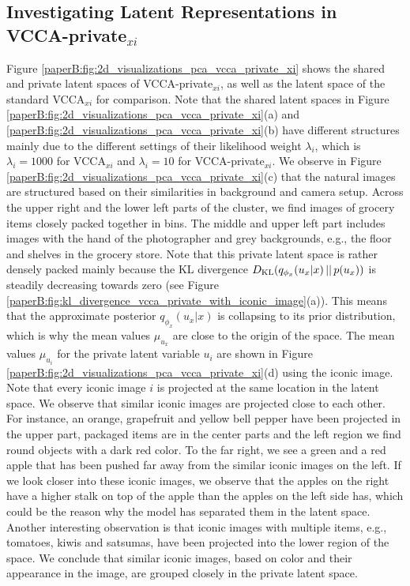 
\subsection{Investigating Latent Representations in VCCA-private\texorpdfstring{$_{x i}$}{TEXT}}
\label{paperB:app:investigating_latent_representations_in_vcca_private_xi}

Figure \ref{paperB:fig:2d_visualizations_pca_vcca_private_xi} shows the shared and private latent spaces of VCCA-private$_{x i}$, as well as the latent space of the standard VCCA$_{x i}$ for comparison. Note that the shared latent spaces in Figure \ref{paperB:fig:2d_visualizations_pca_vcca_private_xi}(a) and \ref{paperB:fig:2d_visualizations_pca_vcca_private_xi}(b) have different structures mainly due to the different settings of their likelihood weight $\lambda_{i}$, which is $\lambda_{i} = 1000$ for VCCA$_{x i}$ and $\lambda_{i} = 10$ for VCCA-private$_{x i}$. We observe in Figure \ref{paperB:fig:2d_visualizations_pca_vcca_private_xi}(c) that the natural images are structured based on their similarities in background and camera setup. Across the upper right and the lower left parts of the cluster, we find images of grocery items closely packed together in bins. The middle and upper left part includes images with the hand of the photographer and grey backgrounds, e.g., the floor and shelves in the grocery store. Note that this private latent space is rather densely packed mainly because the KL divergence $D_{\mathrm{KL}}(q_{\phi_{x}}(u_{x} |x)\,||\,p(u_{x}))$ is steadily decreasing towards zero (see Figure \ref{paperB:fig:kl_divergence_vcca_private_with_iconic_image}(a)). This means that the approximate posterior $q_{\phi_{x}}(u_{x} |x)$ is collapsing to its prior distribution, which is why the mean values $\mu_{u_{x}}$ are close to the origin of the space. The mean values $\mu_{u_{i}}$ for the private latent variable $u_{i}$ are shown in Figure \ref{paperB:fig:2d_visualizations_pca_vcca_private_xi}(d) using the iconic image. Note that every iconic image $i$ is projected at the same location in the latent space. We observe that similar iconic images are projected close to each other. For instance, an orange, grapefruit and yellow bell pepper have been projected in the upper part, packaged items are in the center parts and the left region we find round objects with a dark red color. To the far right, we see a green and a red apple that has been pushed far away from the similar iconic images on the left. If we look closer into these iconic images, we observe that the apples on the right have a higher stalk on top of the apple than the apples on the left side has, which could be the reason why the model has separated them in the latent space. Another interesting observation is that iconic images with multiple items, e.g., tomatoes, kiwis and satsumas, have been projected into the lower region of the space. We conclude that similar iconic images, based on color and their appearance in the image, are grouped closely in the private latent space.  


